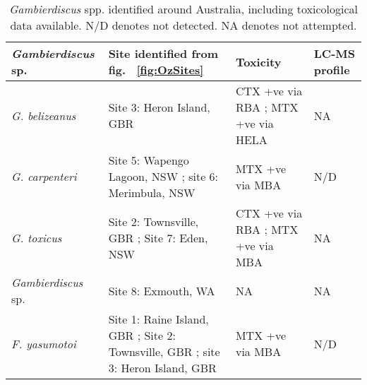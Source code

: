 \documentclass[12pt]{article}
\begin{document}
\begin{table}
\caption{\emph{Gambierdiscus} spp. identified around Australia, including toxicological data available. N/D denotes not detected. NA denotes not attempted.}
\label{tbl:OzTable}
\begin{tabular}{ | p{3.3cm} | p{4cm} | p{4.5cm} | p{2.3cm} | }
\hline
 \textbf{\emph{Gambierdiscus} sp.} & \textbf{Site identified from fig. ~\ref{fig:OzSites}} & \textbf{Toxicity}  & \textbf{LC-MS profile}  \\
 \hline
 \emph{G. belizeanus}  & Site 3: Heron Island, GBR \citep{murray2014molecular} & CTX +ve via RBA \citep{chinain2010growth}; MTX +ve via HELA \citep{holland2013differences} & NA  \\
 \hline
 \emph{G. carpenteri} &Site 5: Wapengo Lagoon, NSW \citep{kohli2014high}; site 6:  Merimbula, NSW  \citep{kohli2014high}& MTX +ve via MBA \citep{kohli2014high} & N/D \citep{kohli2014high}\\
 \hline
 \emph{G. toxicus} & Site 2: Townsville, GBR \citep{hallegraeff2010algae}; Site 7: Eden, NSW \citep{hallegraeff2010algae} & CTX +ve via RBA \citep{chinain2010growth}; MTX +ve via MBA \citep{chinain1999morphology} & NA \\
  \hline
  \emph{Gambierdiscus} sp. & Site 8: Exmouth, WA \citep{kohli2014cob}& NA & NA \\
  \hline
 \emph{F. yasumotoi}  & Site 1: Raine Island, GBR \citep{murray2014molecular}; Site 2: Townsville, GBR \citep{murray2014molecular}; site 3: Heron Island, GBR \citep{murray2014molecular}& MTX +ve via MBA \citep{holmes1998gambierdiscus} & N/D \citep{rhodes2014gambierdiscus}\\
  \hline
\end{tabular}
\end{table}

\FloatBarrier
\end{document}
